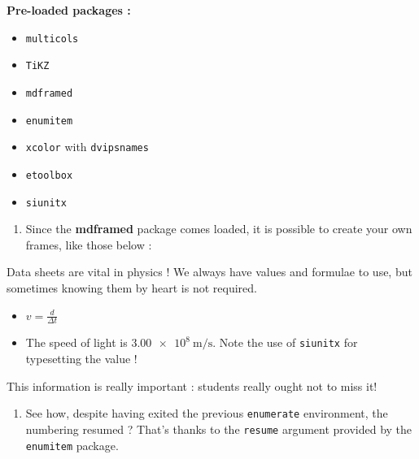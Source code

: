 \documentclass[12pt,code]{HSP-Test}
\begin{document}
\begin{doc}
		\textbf{Pre-loaded packages :}
		\vspace{-\baselineskip}
		\begin{multicols*}{2}
			\begin{itemize}
				\item \texttt{multicols}
				\item \texttt{TiKZ}
				\item \texttt{mdframed}
				\item \texttt{enumitem}
				\item \texttt{xcolor} with \texttt{dvipsnames}
				\item \texttt{etoolbox}
				\item \texttt{siunitx}
			\end{itemize}
		\end{multicols*}
	\end{doc}
	
	\begin{enumerate}[label=\bfseries\arabic*.]
		\item Since the \textbf{mdframed} package comes loaded, it is possible to create your own frames, like those below :
	\end{enumerate}
	
	\begin{mdframed}[frametitle={\colorbox{white}{\space Data sheet\space}},
					 frametitleaboveskip=-\ht\strutbox]
		Data sheets are vital in physics ! We always have values and formulae to use, but sometimes knowing them by heart is not required.
		\begin{itemize}
			\item $v = \frac{d}{\Delta t}$
			\item The speed of light is $\SI{3.00e8}{\meter\per\second}$. Note the use of \texttt{siunitx} for typesetting the value !
		\end{itemize}
	\end{mdframed}
	
	\begin{mdframed}[frametitle={\colorbox{cPrim!10}{\space Warning ! \space}},
					 frametitleaboveskip=-\ht\strutbox,
					 backgroundcolor=cPrim!10,
					 linecolor=cPrim,
					 ]
		This information is really important : students really ought not to miss it!
	\end{mdframed}
	
	\begin{enumerate}[resume,label=\bfseries\arabic*.]
		\item See how, despite having exited the previous \texttt{enumerate} environment, the numbering resumed ? That's thanks to the \texttt{resume} argument provided by the \texttt{enumitem} package.
	\end{enumerate}
\end{document}
